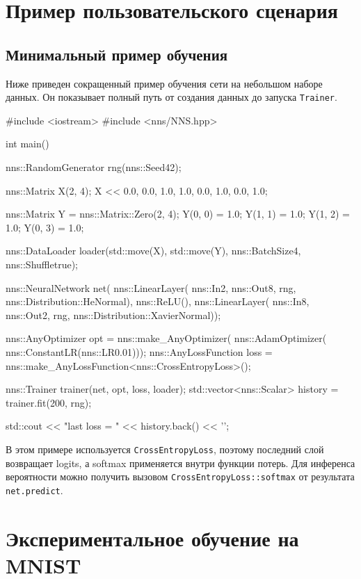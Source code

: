 \documentclass{article}
\begin{document}
\section{Пример пользовательского сценария}

\subsection{Минимальный пример обучения}

Ниже приведен сокращенный пример обучения сети на небольшом наборе
данных. Он показывает полный путь от создания данных до запуска
\texttt{Trainer}.
\begin{cppcode}
#include <iostream>
#include <nns/NNS.hpp>

int main() {
    nns::RandomGenerator rng(nns::Seed{42});

    nns::Matrix X(2, 4);
    X << 0.0, 0.0, 1.0, 1.0,
         0.0, 1.0, 0.0, 1.0;

    nns::Matrix Y = nns::Matrix::Zero(2, 4);
    Y(0, 0) = 1.0;
    Y(1, 1) = 1.0;
    Y(1, 2) = 1.0;
    Y(0, 3) = 1.0;

    nns::DataLoader loader(std::move(X), std::move(Y),
                           nns::BatchSize{4}, nns::Shuffle{true});

    nns::NeuralNetwork net(
        nns::LinearLayer(
            nns::In{2},
            nns::Out{8},
            rng,
            nns::Distribution::HeNormal),
        nns::ReLU(),
        nns::LinearLayer(
            nns::In{8},
            nns::Out{2},
            rng,
            nns::Distribution::XavierNormal));

    nns::AnyOptimizer opt =
        nns::make_AnyOptimizer(
            nns::AdamOptimizer(
                nns::ConstantLR(nns::LR{0.01})));
    nns::AnyLossFunction loss =
        nns::make_AnyLossFunction<nns::CrossEntropyLoss>();

    nns::Trainer trainer(net, opt, loss, loader);
    std::vector<nns::Scalar> history = trainer.fit(200, rng);

    std::cout << "last loss = " << history.back() << '\n';
}
\end{cppcode}
В этом примере используется \texttt{CrossEntropyLoss}, поэтому
последний слой возвращает logits, а softmax применяется внутри функции
потерь. Для инференса вероятности можно получить вызовом
\texttt{CrossEntropyLoss::softmax} от результата \texttt{net.predict}.

\section{Экспериментальное обучение на MNIST}
\end{document}

